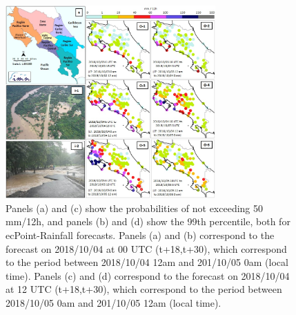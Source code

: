 \documentclass[twocol]{ametsocV5} %
\begin{document}
\begin{figure}
\centerline{\includegraphics[width=19pc]{manuscript/Figures/Fig6.jpg}}
\caption{Panels (a) and (c) show the probabilities of not exceeding 50 mm/12h, and panels (b) and (d) show the 99th percentile, both for ecPoint-Rainfall forecasts. Panels (a) and (b) correspond to the forecast on 2018/10/04 at 00 UTC (t+18,t+30), which correspond to the period between 2018/10/04 12am and 201/10/05 0am (local time). Panels (c) and (d) correspond to the forecast on 2018/10/04 at 12 UTC (t+18,t+30), which correspond to the period between 2018/10/05 0am and 201/10/05 12am (local time).} 
\label{Fig6}
\end{figure}
\end{document}
